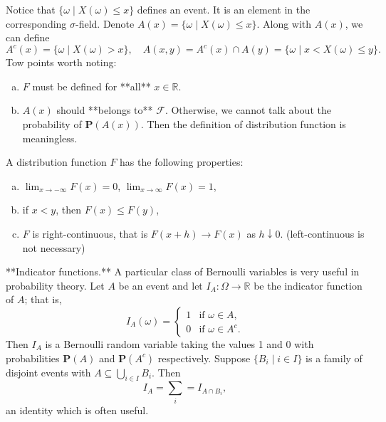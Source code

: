 Notice that $\{ \omega \;\vert\; X(\omega) \leq x\}$ defines an event. It is an element in the corresponding $\sigma$-field. Denote $A(x) = \{ \omega \;\vert\; X(\omega) \leq x \}$. Along with $A(x)$, we can define
\begin{equation*}
    A^c(x) = \{ \omega \;\vert\; X(\omega) > x \}, \quad A(x, y) = A^c(x) \cap A(y) = \{ \omega \;\vert\; x < X(\omega) \leq y \}.
\end{equation*}
Tow points worth noting:
\begin{enumerate}[(a)]
    \item $F$ must be defined for **all** $x \in \mathbb{R}$.
    \item $A(x)$ should **belongs to** $\mathcal{F}$. Otherwise, we cannot talk about the probability of $\mathbf{P}(A(x))$. Then the definition of distribution function is meaningless.
\end{enumerate}

\begin{lemma}
A distribution function $F$ has the following properties:
\begin{enumerate}[(a)]
    \item $\lim_{x \to -\infty}F(x) = 0$, $\lim_{x\to\infty} F(x) = 1$,
    \item if $x < y$, then $F(x) \leq F(y)$,
    \item $F$ is right-continuous, that is $F(x+h) \to F(x)$ as $h \downarrow 0$. (left-continuous is not necessary)
\end{enumerate}
\end{lemma}

\begin{example}
**Indicator functions.** A particular class of Bernoulli variables is very useful in probability theory. Let $A$ be an event and let $I_A : \Omega \to \mathbb{R}$ be the indicator function of $A$; that is,
\begin{equation*}
    I_A(\omega) = \begin{cases} 1 & \text{if $\omega \in A$}, \\ 0 & \text{if $\omega \in A^c$}. \end{cases}
\end{equation*}
Then $I_A$ is a Bernoulli random variable taking the values 1 and 0 with probabilities $\mathbf{P}(A)$ and $\mathbf{P}(A^c)$ respectively. Suppose $\{B_i \;\vert\; i \in I\}$ is a family of disjoint events with $A \subseteq \bigcup_{i\in I} B_i$. Then 
\begin{equation*}
    I_A = \sum_{i} = I_{A\cap B_i},
\end{equation*}
an identity which is often useful.
\end{example}

